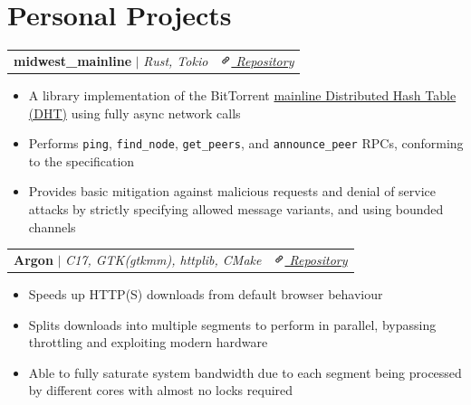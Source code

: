 \documentclass[letterpaper, 10pt]{article}
\makeatletter
\newcommand{\resumeProjectHeading}[2]{
    \begin{tabular*}{\textwidth}{l@{\extracolsep{\fill}}r}
        \small#1 & #2 \\
    \end{tabular*}\vspace{-1.5em}
}
\newenvironment{ResumeItem}{
    \vspace{-0.5em}
    \begin{itemize}
        \setlength\itemsep{-0.3em}
        }{
    \end{itemize}\vspace{-0.3em}}
\newcommand{\cxx}{C\nolinebreak\hspace{-.05em}\raisebox{0.2ex}{\bf +}\nolinebreak\hspace{-.05em}\raisebox{.2ex}{\bf +}}
\makeatother
\begin{document}
    \section{Personal Projects}
    \resumeProjectHeading
    {\textbf{midwest\_mainline} $|$ \emph{Rust, Tokio}}{\href{https://github.com/Internal-Compiler-Error/midwest_mainline}{\textit{{\includegraphics[height=9pt, trim=0 5cm 0 -1.5cm]{link-icon} Repository}}}}

    \begin{ResumeItem}
        \item{A library implementation of the BitTorrent \href{https://www.bittorrent.org/beps/bep_0005.html}{mainline Distributed Hash Table (DHT)} using fully async network calls}
        \item{Performs \texttt{ping}, \texttt{find\_node}, \texttt{get\_peers}, and \texttt{announce\_peer} RPCs, conforming to the specification}
        \item{Provides basic mitigation against malicious requests and denial of service attacks by strictly specifying allowed message variants, and using bounded channels}
    \end{ResumeItem}

    \resumeProjectHeading
    {\textbf{Argon} $|$ \emph{\cxx 17, GTK(gtkmm), httplib, CMake}}{\href{https://github.com/Internal-Compiler-Error/Argon}{\textit{{\includegraphics[height=9pt, trim=0 5cm 0 -1.5cm]{link-icon} Repository}}}}
    \begin{ResumeItem}
        \item{Speeds up HTTP(S) downloads from default browser behaviour}
        \item{Splits downloads into multiple segments to perform in parallel, bypassing throttling and exploiting modern hardware}
        \item{Able to fully saturate system bandwidth due to each segment being processed by different cores with almost no locks required}
    \end{ResumeItem}
\end{document}
